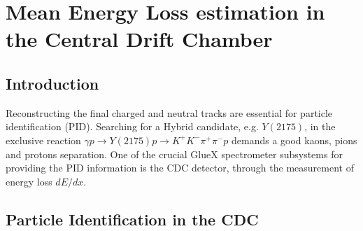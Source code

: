 \section{Mean Energy Loss estimation in the Central Drift Chamber}
\label{p3}

\subsection{Introduction}

Reconstructing the final charged and neutral tracks are essential for particle identification (PID). Searching for a Hybrid candidate, e.g. $Y(2175)$, in the exclusive reaction $\gamma p \rightarrow Y(2175) p \rightarrow K^{+}K^{-}\pi^{+}\pi^{-}p$ demands a good kaons, pions and protons separation. One of the crucial GlueX spectrometer subsystems for providing the PID information is the CDC detector, through the measurement of energy loss $dE/dx$.

\subsection{Particle Identification in the CDC}

